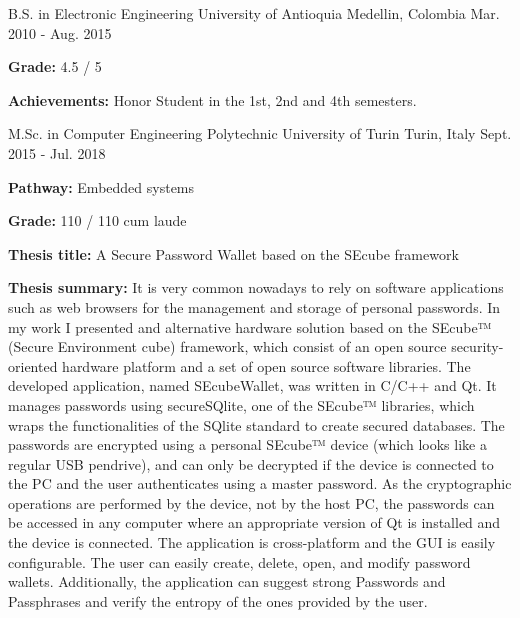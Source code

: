 

\begin{cventries}

  \cventry
    {B.S. in Electronic Engineering} %
    {University of Antioquia} %
    {Medellin, Colombia} %
    {Mar. 2010 - Aug. 2015} %
    {
      \begin{cvitems} %
        \item {\textbf{Grade:} 4.5 / 5}
        \item {\textbf{Achievements:} Honor Student in the 1st, 2nd and 4th semesters.}
      \end{cvitems}
    }

  \cventry
    {M.Sc. in Computer Engineering}
    {Polytechnic University of Turin}
    {Turin, Italy}
    {Sept. 2015 - Jul. 2018}
    {
      \begin{cvitems}
        \item {\textbf{Pathway:} Embedded systems}
        \item {\textbf{Grade:} 110 / 110 cum laude}
        \item {\textbf{Thesis title:}  A Secure Password Wallet based on the
        SEcube framework}
        \item {\textbf{Thesis summary:} It is very common nowadays to rely on software
        applications such as web browsers for the management and storage of personal
        passwords.
        In my work I presented and alternative hardware solution based on the SEcube™
        (Secure Environment cube) framework, which consist of an open source
        security-oriented hardware platform and a set of open source software libraries.
        The developed application, named SEcubeWallet,
        was written in C/C++ and Qt. It manages passwords using secureSQlite,
        one of the SEcube™ libraries, which wraps the functionalities of the SQlite
        standard to create secured databases. The passwords are encrypted using a
        personal SEcube™ device (which looks like a regular USB pendrive),
        and can only be decrypted if the device is connected to the PC and the
        user authenticates using a master password.
        As the cryptographic operations are performed by the device, not by the host PC, the
        passwords can be accessed in any computer where an appropriate
        version of Qt is installed and the device is connected.
        The application is cross-platform and the GUI is easily configurable.
        The user can easily create, delete, open,
        and modify password wallets. Additionally, the application can suggest strong Passwords and
        Passphrases and verify the entropy of the ones provided by the user.
        }
      \end{cvitems}
    }

\end{cventries}
